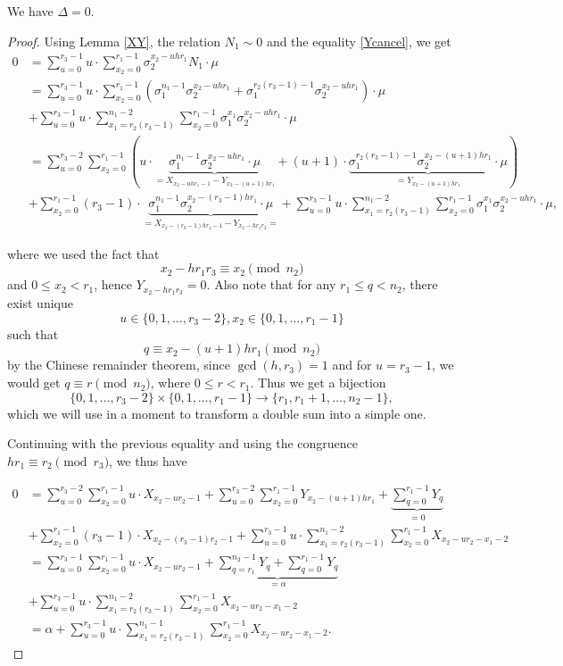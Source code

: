 \begin{lemma}\label{D0}
We have $\Delta=0$.
\end{lemma}
\begin{proof}
Using Lemma \ref{XY}, the relation $N_1\sim 0$ and the equality \eqref{Ycancel},
we get
\begin{align*}
0&= \sum_{u=0}^{r_3-1}u\cdot \sum _{x_2=0}^{r_1-1}\sigma_2^{x_2-uh r_1}N_1\cdot \mu\\
&=\sum_{u=0}^{r_3-1}u\cdot \sum _{x_2=0}^{r_1-1} \left( \sigma_1^{n_1-1}\sigma_2^{x_2-uh r_1}+\sigma_1^{r_2(r_3-1)-1}\sigma_2^{x_2-uh r_1}\right)\cdot \mu\\
&+\sum_{u=0}^{r_3-1}u\cdot \sum_{x_1=r_2(r_3-1)}^{n_1-2}\sum _{x_2=0}^{r_1-1}\sigma_1^{x_1}\sigma_2^{x_2-uh r_1}\cdot \mu\\
&=\sum_{u=0}^{r_3-2} \sum _{x_2=0}^{r_1-1} \left( u\cdot\underbrace{\sigma_1^{n_1-1}\sigma_2^{x_2-uh r_1}\cdot \mu}_{=X_{x_2-uhr_1-1}-Y_{x_2-(u+1)hr_1}}+(u+1)\cdot\underbrace{\sigma_1^{r_2(r_3-1)-1}\sigma_2^{x_2-(u+1)h r_1}\cdot \mu}_{=Y_{x_2-(u+1)h r_1}}\right)\\
&+\sum_{x_2=0}^{r_1-1}(r_3-1)\cdot \underbrace{\sigma_1^{n_1-1}\sigma_2^{x_2-(r_3-1)h r_1}\cdot \mu}_{=
X_{x_2-(r_3-1)hr_1-1}-Y_{x_2-hr_1r_3}=
}+\sum_{u=0}^{r_3-1}u\cdot \sum_{x_1=r_2(r_3-1)}^{n_1-2}\sum _{x_2=0}^{r_1-1}\sigma_1^{x_1}\sigma_2^{x_2-uh r_1}\cdot \mu,
\end{align*}

where we used the fact that $$x_2-hr_1r_3\equiv x_2\pmod{n_2}$$  and $0\leq x_2< r_1$, hence $Y_{x_2-hr_1r_3}=0$. Also note that for any $r_1\leq q<n_2$, there exist unique $$u\in\{0,1,\dots,r_3-2\},x_2\in\{0,1,\dots,r_1-1\}$$ such that $$q\equiv x_2-(u+1)hr_1 \pmod{n_2}$$ by the Chinese remainder theorem, since $\gcd(h,r_3)=1$ and for $u=r_3-1$, we would get  $q\equiv r\pmod{n_2}$, where $0\leq r<r_1$. Thus we get a bijection $$\{0,1,\dots,r_3-2\}\times\{0,1,\dots,r_1-1\}\to \{r_1,r_1+1,\dots,n_2-1\},$$ which we will use in a moment to transform a double sum into a simple one.

Continuing with the previous equality and using the congruence $hr_1\equiv r_2\pmod{r_3}$, we thus have

\begin{align*}
0&=\sum_{u=0}^{r_3-2} \sum _{x_2=0}^{r_1-1} u\cdot X_{x_2-ur_2-1}+\sum_{u=0}^{r_3-2} \sum _{x_2=0}^{r_1-1} Y_{x_2-(u+1)hr_1}+\underbrace{\sum_{q=0}^{r_1-1}Y_{q}}_{=0}\\
&+\sum_{x_2=0}^{r_1-1}(r_3-1)\cdot X_{x_2-(r_3-1)r_2-1}+\sum_{u=0}^{r_3-1}u\cdot \sum_{x_1=r_2(r_3-1)}^{n_1-2}\sum _{x_2=0}^{r_1-1}X_{x_2-ur_2-x_1-2}\\
&=\sum_{u=0}^{r_3-1} \sum _{x_2=0}^{r_1-1} u\cdot X_{x_2-ur_2-1}+\underbrace{\sum_{q=r_1}^{n_2-1} Y_{q}+\sum_{q=0}^{r_1-1}Y_{q}}_{=\alpha}\\
&+\sum_{u=0}^{r_3-1}u\cdot \sum_{x_1=r_2(r_3-1)}^{n_1-2}\sum _{x_2=0}^{r_1-1}X_{x_2-ur_2-x_1-2}\\
&=\alpha+\sum_{u=0}^{r_3-1}u\cdot \sum_{x_1=r_2(r_3-1)}^{n_1-1}\sum _{x_2=0}^{r_1-1}X_{x_2-ur_2-x_1-2}.
\end{align*}


\end{proof}
